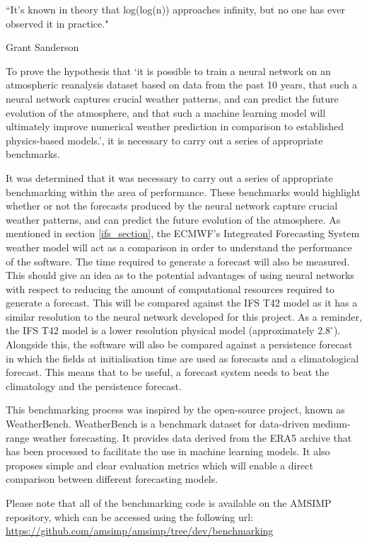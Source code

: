 \epigraph{``It's known in theory that log(log(n)) approaches infinity, but no one has ever observed it in practice."}{Grant Sanderson}

To prove the hypothesis that `it is possible to train a neural network on an atmospheric reanalysis dataset based on data from the past 10 years, that such a neural network captures crucial weather patterns, and can predict the future evolution of the atmosphere, and that such a machine learning model will ultimately improve numerical weather prediction in comparison to established physics-based models.', it is necessary to carry out a series of appropriate benchmarks.

It was determined that it was necessary to carry out a series of appropriate benchmarking within the area of performance. These benchmarks would highlight whether or not the forecasts produced by the neural network capture crucial weather patterns, and can predict the future evolution of the atmosphere. As mentioned in section \ref{ifs_section}, the ECMWF's Integreated Forecasting System weather model will act as a comparison in order to understand the performance of the software. The time required to generate a forecast will also be measured. This should give an idea as to the potential advantages of using neural networks with respect to reducing the amount of computational resources required to generate a forecast. This will be compared against the IFS T42 model as it has a similar resolution to the neural network developed for this project. As a reminder, the IFS T42 model is a lower resolution physical model (approximately $2.8^{\circ}$).  Alongside this, the software will also be compared against a persistence forecast in which the fields at initialisation time are used as forecasts and a climatological forecast. This means that to be useful, a forecast system needs to beat the climatology and the persistence forecast.

This benchmarking process was inspired by the open-source project, known as WeatherBench. WeatherBench is a benchmark dataset for data-driven medium-range weather forecasting. It provides data derived from the ERA5 archive that has been processed to facilitate the use in machine learning models. It also proposes simple and clear evaluation metrics which will enable a direct comparison between different forecasting models\cite{rasp2020weatherbench}. 

Please note that all of the benchmarking code is available on the AMSIMP repository, which can be accessed using the following url: \url{https://github.com/amsimp/amsimp/tree/dev/benchmarking}

